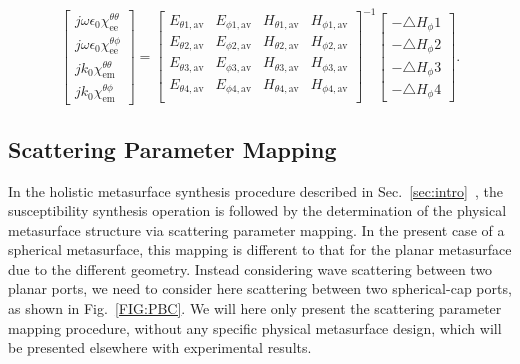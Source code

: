 \documentclass[journal,transaction]{IEEEtran}
\newcommand{\figref}{Fig.~\ref}
\begin{document}
\begin{small}
\begin{equation}\label{four_chi}
 \begin{bmatrix}
   j\omega\epsilon_0 \chi^{\theta\theta}_\text{ee}\\
 j\omega\epsilon_0\chi^ {\theta\phi}_\text{ee}\\
      jk_0\chi^{\theta \theta}_\text{em}\\
         jk_0\chi^{\theta \phi}_\text{em}
  \end{bmatrix}=
       \begin{bmatrix}
  E_{\theta1,\text{av}}& E_{\phi1,\text{av}}&H_{\theta1,\text{av}}&H_{\phi1,\text{av}}\\
  E_{\theta2,\text{av}}& E_{\phi2,\text{av}}&H_{\theta2,\text{av}}&H_{\phi2,\text{av}} \\
  E_{\theta3,\text{av}}& E_{\phi3,\text{av}}&H_{\theta3,\text{av}}&H_{\phi3,\text{av}} \\
     E_{\theta4,\text{av}}& E_{\phi4,\text{av}}&H_{\theta4,\text{av}}&H_{\phi4,\text{av}} \\
  \end{bmatrix}^{-1}
     \begin{bmatrix}
   -\triangle H_\phi1 \\
   -\triangle H_\phi2\\
      -\triangle H_\phi3\\
         -\triangle H_\phi4
  \end{bmatrix}.
\end{equation}
\end{small}

\subsection{Scattering Parameter Mapping}\label{sec:chi_to_RT}

In the holistic metasurface synthesis procedure described in Sec.~\ref{sec:intro}~\cite{YV_Computation_MS2016,2017_12_Achouri_Nanophotonics}, the susceptibility synthesis operation is followed by the determination of the physical metasurface structure via scattering parameter mapping. In the present case of a spherical metasurface, this mapping is different to that for the planar metasurface due to the different geometry. Instead considering wave scattering between two planar ports, we need to consider here scattering between two spherical-cap ports, as shown in \figref{FIG:PBC}. We will here only present the scattering parameter mapping procedure, without any specific physical metasurface design, which will be presented elsewhere with experimental results.
\end{document}
